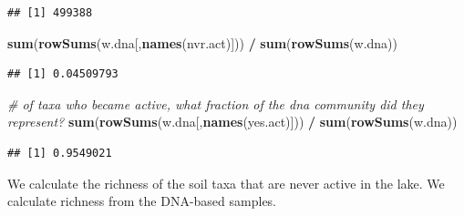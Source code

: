 \documentclass[]{article}
\newenvironment{Shaded}{\begin{snugshade}}{\end{snugshade}}
\newcommand{\CommentTok}[1]{\textcolor[rgb]{0.56,0.35,0.01}{\textit{#1}}}
\newcommand{\KeywordTok}[1]{\textcolor[rgb]{0.13,0.29,0.53}{\textbf{#1}}}
\newcommand{\NormalTok}[1]{#1}
\newcommand{\OperatorTok}[1]{\textcolor[rgb]{0.81,0.36,0.00}{\textbf{#1}}}
\newcommand{\StringTok}[1]{\textcolor[rgb]{0.31,0.60,0.02}{#1}}
\begin{document}
\begin{verbatim}
## [1] 499388
\end{verbatim}

\begin{Shaded}
\begin{Highlighting}[]
\KeywordTok{sum}\NormalTok{(}\KeywordTok{rowSums}\NormalTok{(w.dna[,}\KeywordTok{names}\NormalTok{(nvr.act)])) }\OperatorTok{/}\StringTok{ }\KeywordTok{sum}\NormalTok{(}\KeywordTok{rowSums}\NormalTok{(w.dna))}
\end{Highlighting}
\end{Shaded}

\begin{verbatim}
## [1] 0.04509793
\end{verbatim}

\begin{Shaded}
\begin{Highlighting}[]
\CommentTok{# of taxa who became active, what fraction of the dna community did they represent?}
\KeywordTok{sum}\NormalTok{(}\KeywordTok{rowSums}\NormalTok{(w.dna[,}\KeywordTok{names}\NormalTok{(yes.act)])) }\OperatorTok{/}\StringTok{ }\KeywordTok{sum}\NormalTok{(}\KeywordTok{rowSums}\NormalTok{(w.dna))}
\end{Highlighting}
\end{Shaded}

\begin{verbatim}
## [1] 0.9549021
\end{verbatim}

\begin{Shaded}
\end{Shaded}

We calculate the richness of the soil taxa that are never active in the
lake. We calculate richness from the DNA-based samples.
\end{document}
